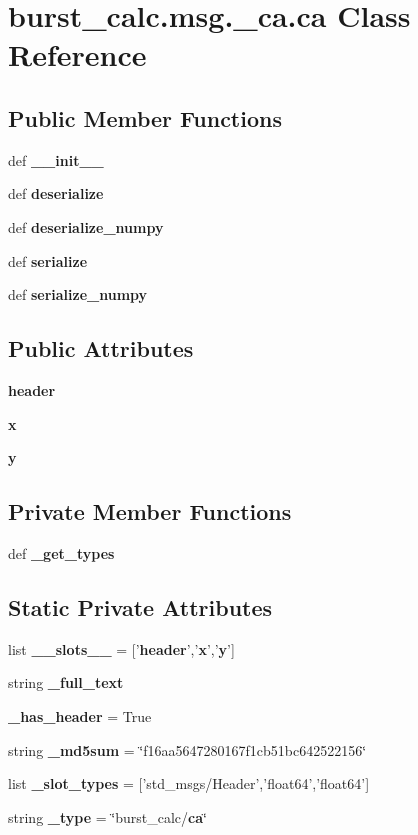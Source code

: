 \section{burst\-\_\-calc.\-msg.\-\_\-ca.\-ca \-Class \-Reference}
\label{classburst__calc_1_1msg_1_1__ca_1_1ca}
\subsection*{\-Public \-Member \-Functions}
\begin{DoxyCompactItemize}
\item 
def {\bf \-\_\-\-\_\-init\-\_\-\-\_\-}
\item 
def {\bf deserialize}
\item 
def {\bf deserialize\-\_\-numpy}
\item 
def {\bf serialize}
\item 
def {\bf serialize\-\_\-numpy}
\end{DoxyCompactItemize}
\subsection*{\-Public \-Attributes}
\begin{DoxyCompactItemize}
\item 
{\bf header}
\item 
{\bf x}
\item 
{\bf y}
\end{DoxyCompactItemize}
\subsection*{\-Private \-Member \-Functions}
\begin{DoxyCompactItemize}
\item 
def {\bf \-\_\-get\-\_\-types}
\end{DoxyCompactItemize}
\subsection*{\-Static \-Private \-Attributes}
\begin{DoxyCompactItemize}
\item 
list {\bf \-\_\-\-\_\-slots\-\_\-\-\_\-} = ['{\bf header}','{\bf x}','{\bf y}']
\item 
string {\bf \-\_\-full\-\_\-text}
\item 
{\bf \-\_\-has\-\_\-header} = \-True
\item 
string {\bf \-\_\-md5sum} = \char`\"{}f16aa5647280167f1cb51bc642522156\char`\"{}
\item 
list {\bf \-\_\-slot\-\_\-types} = ['std\-\_\-msgs/\-Header','float64','float64']
\item 
string {\bf \-\_\-type} = \char`\"{}burst\-\_\-calc/{\bf ca}\char`\"{}
\end{DoxyCompactItemize}


